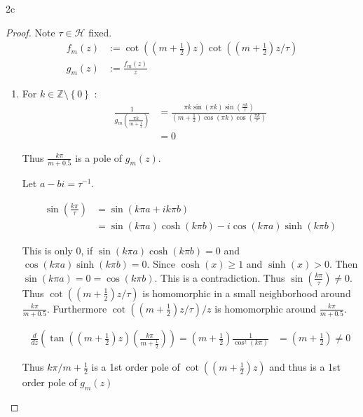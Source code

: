 \documentclass{article}
\newcommand*{\HC}{\mathcal{H}}
\newcommand{\Z}{\mathbb{Z}}
\begin{document}
\begin{PROB}{2c}\label{Problem 2c.}
\end{PROB}
\begin{proof}
    Note $\tau \in \HC$ fixed.  
    \begin{align*}
        f_m(z) &:= \cot\left(\left(m + \frac{1}{2}\right) z \right) \cot\left(\left(m + \frac{1}{2}\right) z / \tau\right) \\
        g_m(z) &:= \frac{f_m(z)}{z}
    \end{align*}
    
    \begin{enumerate}
        \item For $k \in \Z \setminus \left\{ 0 \right\}$ :  \begin{align*}
            \frac{1}{g_m\left(\frac{\pi k}{m + \frac{1}{2}}\right)} &= \frac{\pi k \sin(\pi k) \sin(\frac{\pi k}{\tau})}{(m + \frac{1}{2}) \cos(\pi k) \cos(\frac{\pi k}{\tau})}\\
            &= 0
        \end{align*}

        Thus $\frac{k \pi}{m + 0.5}$ is a pole of $g_m(z)$. 

        Let $a - bi = \tau^{-1}$.  
        
        \begin{align*}
            \sin\left(\frac{k \pi}{\tau}\right) &= \sin\left(k \pi a + ik \pi b\right) \\
            &= \sin(k \pi a) \cosh(k \pi b) - i \cos(k \pi a)\sinh(k \pi b)
        \end{align*}

        This is only 0, if $\sin(k \pi a)\cosh(k \pi b) = 0$ and $\cos(k \pi a)\sinh(k \pi b) = 0$. Since $\cosh(x) \geq 1$ and $\sinh(x) > 0 $. Then $\sin(k \pi a) = 0 = \cos(k \pi b)$. This is a contradiction. Thus $\sin\left(\frac{k \pi}{\tau}\right) \neq 0$. Thus $\cot\left((m +\frac{1}{2})z / \tau\right)$ is homomorphic in a small neighborhood around $\frac{k \pi}{m  +0.5}$. Furthermore  $\cot\left((m +\frac{1}{2})z / \tau\right) / z$ is homomorphic around $\frac{k \pi}{m  +0.5}$.  
        
        \begin{align*}
            \frac{d}{dz}\left(\tan((m + \frac{1}{2})z)(\frac{k \pi}{m + \frac{1}{2}})\right) = (m + \frac{1}{2})\frac{1}{\cos^2(k \pi)} &= (m + \frac{1}{2}) \neq 0
        \end{align*}

        Thus $k \pi / m + \frac{1}{2}$ is a 1st order pole of $\cot((m + \frac{1}{2}) z)$ and thus is a 1st order pole of $g_m(z)$  
        

\end{enumerate}
\end{proof}
\end{document}
